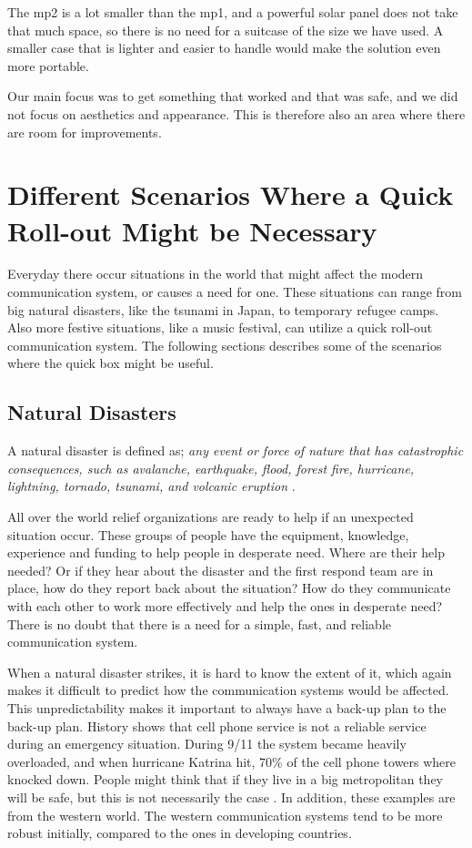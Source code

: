 The \gls{mp2} is a lot smaller than the \gls{mp1}, and a powerful solar panel does not take that much space, so there is no need for a suitcase of the size we have used. A smaller case that is lighter and easier to handle would make the solution even more portable. 

Our main focus was to get something that worked and that was safe, and we did not focus on aesthetics and appearance. This is therefore also an area where there are room for improvements. 

 
\section{Different Scenarios Where a Quick Roll-out Might be Necessary}
Everyday there occur situations in the world that might affect the modern communication system, or causes a need for one. These situations can range from big natural disasters, like the tsunami in Japan, to temporary refugee camps. Also more festive situations, like a music festival, can utilize a quick roll-out communication system. The following sections describes some of the scenarios where the \gls{quick} box might be useful. 

\subsection{Natural Disasters}
A natural disaster is defined as; \textit{any event or force of nature that has catastrophic consequences, such as avalanche, earthquake, flood, forest fire, hurricane, lightning, tornado, tsunami, and volcanic eruption} \cite{naturalDisaster}.

All over the world relief organizations are ready to help if an unexpected situation occur. These groups of people have the equipment, knowledge, experience and funding to help people in desperate need. Where are their help needed? Or if they hear about the disaster and the first respond team are in place, how do they report back about the situation? How do they communicate with each other to work more effectively and help the ones in desperate need? There is no doubt that there is a need for a simple, fast, and reliable communication system.

When a natural disaster strikes, it is hard to know the extent of it, which  again makes it difficult to predict how the communication systems would be affected. This unpredictability makes it important to always have a back-up plan to the back-up plan. History shows that cell phone service is not a reliable service during an emergency situation. During 9/11 the system became heavily overloaded, and when hurricane Katrina hit, 70\% of the cell phone towers where knocked down. People might think that if they live in a big metropolitan they will be safe, but this is not necessarily the case \cite{disasterComm}. In addition, these examples are from the western world. The western communication systems tend to be more robust initially, compared to the ones in developing countries. 

